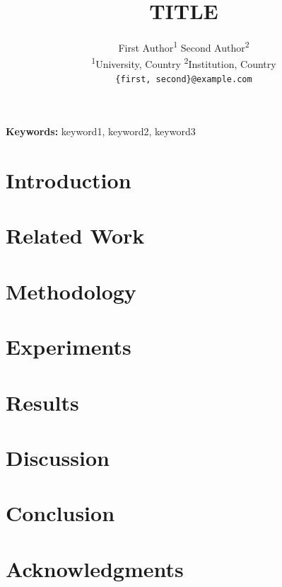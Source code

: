 \documentclass[10pt,twocolumn]{article}
\title{TITLE}
\author{
    First Author\textsuperscript{1} \quad
    Second Author\textsuperscript{2} \\
    \small\textsuperscript{1}University, Country \quad
    \small\textsuperscript{2}Institution, Country \\
    \small\texttt{\{first, second\}@example.com}
}
\date{}
\begin{document}
\maketitle

\begin{abstract}
\end{abstract}

\textbf{Keywords:} keyword1, keyword2, keyword3

\section{Introduction}

\section{Related Work}

\section{Methodology}

\section{Experiments}

\section{Results}

\section{Discussion}

\section{Conclusion}

\section*{Acknowledgments}



\end{document}
